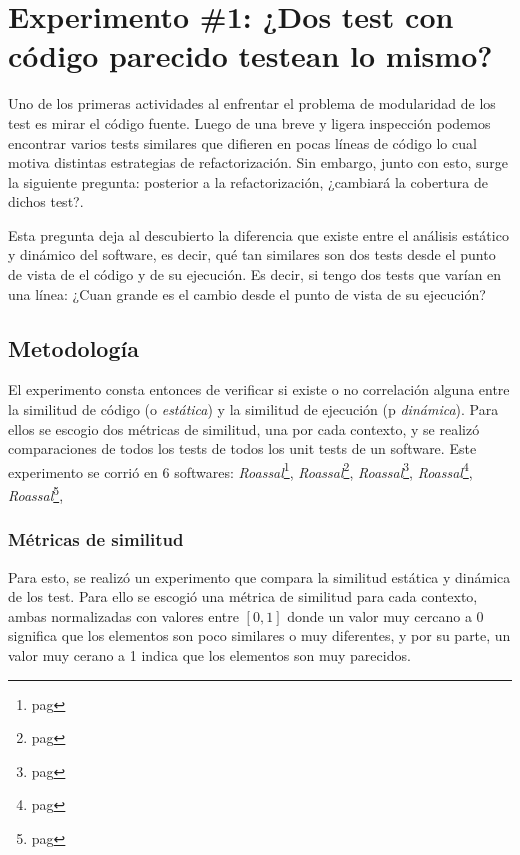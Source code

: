 \chapter{Experimento \#1: ¿Dos test con código parecido testean lo mismo? }

\par Uno de los primeras actividades al enfrentar el problema de modularidad de los test es mirar el código fuente. Luego de una breve y ligera inspección podemos encontrar varios tests similares que difieren en pocas líneas de código lo cual motiva distintas estrategias de refactorización. Sin embargo, junto con esto, surge la siguiente pregunta: posterior a la refactorización, ¿cambiará la cobertura de dichos test?. 

\par Esta pregunta deja al descubierto la diferencia que existe entre el análisis estático y dinámico del software, es decir, qué tan similares son dos tests desde el punto de vista de el código y de su ejecución. Es decir, si tengo dos tests que varían en una línea: ¿Cuan grande es el cambio desde el punto de vista de su ejecución?

\section{Metodología}

\par El experimento consta entonces de verificar si existe o no correlación alguna entre la similitud de código (o \emph{estática}) y la similitud de ejecución (p \emph{dinámica}). Para ellos se escogio dos métricas de similitud, una por cada contexto, y se realizó comparaciones de todos los tests de todos los unit tests de un software. Este experimento se corrió en 6 softwares: \emph{Roassal}\footnote{pag}, \emph{Roassal}\footnote{pag}, \emph{Roassal}\footnote{pag}, \emph{Roassal}\footnote{pag}, \emph{Roassal}\footnote{pag},

\subsection{Métricas de similitud}
\par Para esto, se realizó un experimento que compara la similitud estática y dinámica de los test. Para ello se escogió una métrica de similitud para cada contexto, ambas normalizadas con valores entre $\left[ 0 , 1 \right]$ donde un valor muy cercano a $0$ significa que los elementos son poco similares o muy diferentes, y por su parte, un valor muy cerano a 1 indica que los elementos son muy parecidos. 

